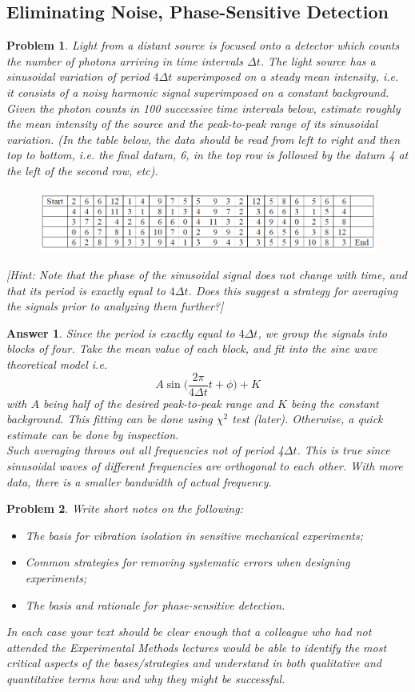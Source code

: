 \documentclass[a4paper]{article}
\newtheorem{ans}{Answer}[section]
\theoremstyle{new}
\newtheorem{qns}{Problem}[section]
\begin{document}
\subsection{Eliminating Noise, Phase-Sensitive Detection}
\begin{qns}
Light from a distant source is focused onto a detector which counts the number of photons arriving in time intervals $\Delta t$. The light source has a sinusoidal variation of period $4\Delta t$ superimposed on a steady mean intensity, i.e. it consists of a noisy harmonic signal superimposed on a constant background. Given the photon counts in 100 successive time intervals below, estimate roughly the mean intensity of the source and the peak-to-peak range of its sinusoidal variation. (In the table below, the data should be read from left to right and then top to bottom, i.e. the final datum, 6, in the top row is followed by the datum 4 at the left of the second row, etc).
\begin{figure}[H]
    \centering
    \includegraphics[scale=0.6]{1_10.PNG}
\end{figure}
[Hint: Note that the phase of the sinusoidal signal does not change with time, and that its period is exactly equal to $4\Delta t$. Does this suggest a strategy for averaging the signals prior to analyzing them further?]
\end{qns}
\begin{ans}
Since the period is exactly equal to $4\Delta t$, we group the signals into blocks of four. Take the mean value of each block, and fit into the sine wave theoretical model i.e. $$A\sin\bigg(\frac{2\pi}{4\Delta t}t+\phi\bigg)+K$$
with $A$ being half of the desired peak-to-peak range and $K$ being the constant background. This fitting can be done using $\chi^2$ test (later). Otherwise, a quick estimate can be done by inspection.\\[5pt]
Such averaging throws out all frequencies not of period 4$\Delta t$. This is true since sinusoidal waves of different frequencies are orthogonal to each other. With more data, there is a smaller bandwidth of actual frequency.
\end{ans}
\begin{qns}
Write short notes on the following:
\begin{itemize}
    \item The basis for vibration isolation in sensitive mechanical experiments;
    \item Common strategies for removing systematic errors when designing experiments;
    \item The basis and rationale for phase-sensitive detection. 
\end{itemize}
In each case your text should be clear enough that a colleague who had not attended the Experimental Methods lectures would be able to identify the most critical aspects of the bases/strategies and understand in both qualitative and quantitative terms how and why they might be successful.
\end{qns}
\end{document}
